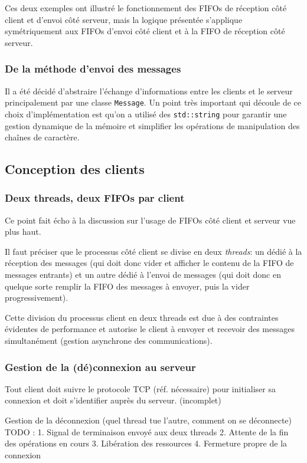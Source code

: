 \documentclass{article}
\begin{document}
Ces deux exemples ont illustré le fonctionnement des FIFOs de réception côté client et d'envoi côté serveur, mais la logique présentée s'applique symétriquement aux FIFOs d'envoi côté client et à la FIFO de réception côté serveur.

\subsubsection{De la méthode d'envoi des messages}
Il a été décidé d'abstraire l'échange d'informations entre les clients et le serveur principalement par une classe \texttt{Message}. Un point très important qui découle de ce choix d'implémentation est qu'on a utilisé des \texttt{std::string} pour garantir une gestion dynamique de la mémoire et simplifier les opérations de manipulation des chaînes de caractère.

\subsection{Conception des clients}

\subsubsection{Deux threads, deux FIFOs par client}
Ce point fait écho à la discussion sur l'usage de FIFOs côté client et serveur vue plus haut. 

Il faut préciser que le processus côté client se divise en deux \textit{threads}: un dédié à la réception des messages (qui doit donc vider et afficher le contenu de la FIFO de messages entrants) et un autre dédié à l'envoi de messages (qui doit donc en quelque sorte remplir la FIFO des messages à envoyer, puis la vider progressivement). 

Cette division du processus client en deux threads est due à des contraintes évidentes de performance et autorise le client à envoyer et recevoir des messages simultanément (gestion asynchrone des communications).

\subsubsection{Gestion de la (dé)connexion au serveur}
Tout client doit suivre le protocole TCP (réf. nécessaire) pour initialiser sa connexion et doit s'identifier auprès du serveur.
(incomplet)


 Gestion de la déconnexion (quel thread tue l'autre, comment on se déconnecte) TODO :
1. Signal de terminaison envoyé aux deux threads
2. Attente de la fin des opérations en cours
3. Libération des ressources
4. Fermeture propre de la connexion
\end{document}

